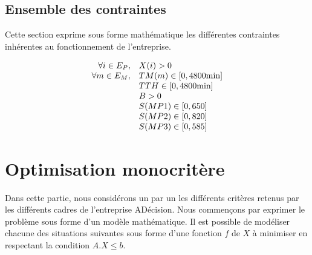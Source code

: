 \documentclass[a4paper, 11pt]{article}
\begin{document}
\subsection{Ensemble des contraintes}
Cette section exprime sous forme mathématique les différentes contraintes
inhérentes au fonctionnement de l'entreprise.

$$
\begin{array}{r l}
    \forall i\in E_P, & X(i) > 0 \\
    \forall m\in E_M, & TM(m) \in [0, 4800\mbox{min}] \\
                      & TTH \in [0, 4800\mbox{min}] \\
                      & B > 0 \\
                      & S(MP1) \in [0, 650] \\
                      & S(MP2) \in [0, 820] \\
                      & S(MP3) \in [0, 585] \\
\end{array}
$$

\section{Optimisation monocritère}
Dans cette partie, nous considérons un par un les différents critères retenus
par les différents cadres de l’entreprise ADécision. Nous commençons par
exprimer le problème sous forme d’un modèle mathématique. Il est possible de
modéliser chacune des situations suivantes sous forme d’une fonction $f$ de $X$ à
minimiser en respectant la condition $A . X \leq b$. \\
\end{document}
